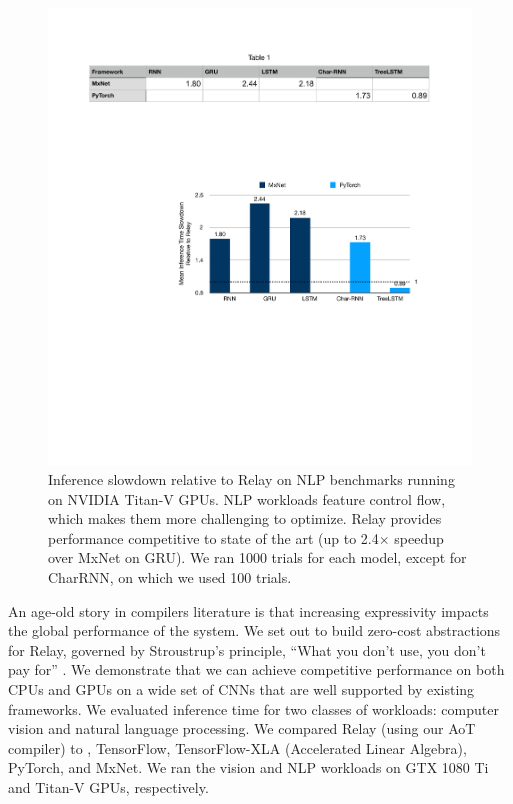   \begin{figure}[h]
    \includegraphics[width=
    \textwidth]{fig_splash19/eval/nlp_TitanV_relay.pdf}
    \caption{
      Inference slowdown relative to Relay on NLP benchmarks running on NVIDIA
        Titan-V GPUs.
      NLP workloads feature control flow,
        which makes them more challenging to optimize.
      Relay provides performance competitive to state of the art (up to
        2.4$\times$ speedup over MxNet on GRU).
      We ran 1000 trials for each model, except for CharRNN, on which we used 100 trials.
    }
    \label{fig:nlp-eval}
  \end{figure}

  An age-old story in compilers literature is that increasing expressivity
    impacts the global performance of the system.
  We set out to build zero-cost abstractions for Relay,
    governed by Stroustrup's principle, ``What you don't use, you don't pay
    for'' \citep{bjarne}.
  We demonstrate that we can achieve competitive performance on both CPUs and
    GPUs on a wide set of CNNs that are well supported by existing frameworks.
  We evaluated inference time for two classes of workloads: computer vision and natural language processing.
  We compared Relay (using our AoT compiler) to \nnvm,
    TensorFlow, TensorFlow-XLA (Accelerated Linear Algebra), PyTorch, and MxNet.
  We ran the vision and NLP workloads on GTX 1080 Ti and Titan-V GPUs, respectively.


